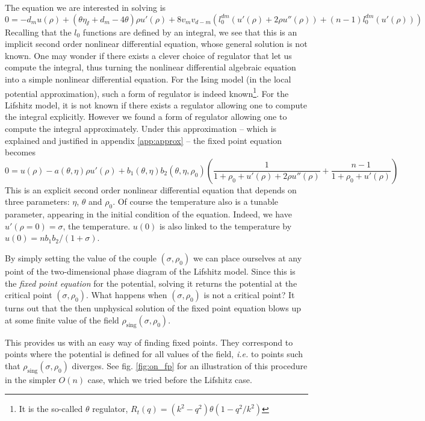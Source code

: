 The equation we are interested in solving is 
\begin{equation}
0 = -d_m u(\rho) +(\theta \eta_\sslash + d_m - 4 \theta) \rho u'(\rho) + 8 v_m v_{d-m} \left( l_0^{dm}\left(u'(\rho) + 2 \rho u''(\rho) \right) + (n-1)l_0^{dm}\left(u'(\rho)\right) \right)
\end{equation}
Recalling that the $l_0$ functions are defined by an integral, we see that this is an implicit second order nonlinear differential equation, whose general solution is not known. One may wonder if there exists a clever choice of regulator that let us compute the integral, thus turning the nonlinear differential algebraic equation into a simple nonlinear differential equation. 
For the Ising model (in the local potential approximation), such a form of regulator is indeed known\footnote{It is the so-called $\theta$ regulator, $R_t(q)= (k^2-q^2) \theta\left(1-q^2/k^2\right)$}. For the Lifshitz model, it is not known if there exists a regulator allowing one to compute the integral explicitly. However we found a form of regulator allowing one to compute the integral approximately. Under this approximation -- which is explained and justified in appendix \ref{app:approx} -- the fixed point equation becomes
\begin{equation}
\label{eq:u_approx}
0 = u(\rho) - a(\theta, \eta)  \rho u'(\rho) + b_1(\theta, \eta) b_2(\theta, \eta, \rho_0) \left( \frac{1}{1 + \rho_0 + u'(\rho) + 2 \rho u''(\rho)} + \frac{n-1}{1+\rho_0+u'(\rho)} \right)
\end{equation}
This is an explicit second order nonlinear differential equation that depends on three parameters: $\eta$, $\theta$ and $\rho_0$. 
Of course the temperature also is a tunable parameter, appearing in the initial condition of the equation. Indeed, we have $u'(\rho=0) = \sigma$, the temperature. $u(0)$ is also linked to the temperature by $u(0) = n b_1 b_2/(1+\sigma)$.

By simply setting the value of the couple $(\sigma, \rho_0)$ we can place ourselves at any point of the two-dimensional phase diagram of the Lifshitz model.
Since this is the \textit{fixed point equation} for the potential, solving it returns the potential at the critical point $(\sigma, \rho_0)$. What happens when $(\sigma, \rho_0)$ is not a critical point? It turns out that the then unphysical solution of the fixed point equation blows up at some finite value of the field $\rho_{\text{sing}}(\sigma, \rho_0)$. 

This provides us with an easy way of finding fixed points. They correspond to points where the potential is defined for all values of the field, \textit{i.e.} to points such that $\rho_{\text{sing}}(\sigma, \rho_0)$ diverges. See fig. \eqref{fig:on_fp} for an illustration of this procedure in the simpler $O(n)$ case, which we tried before the Lifshitz case. 

